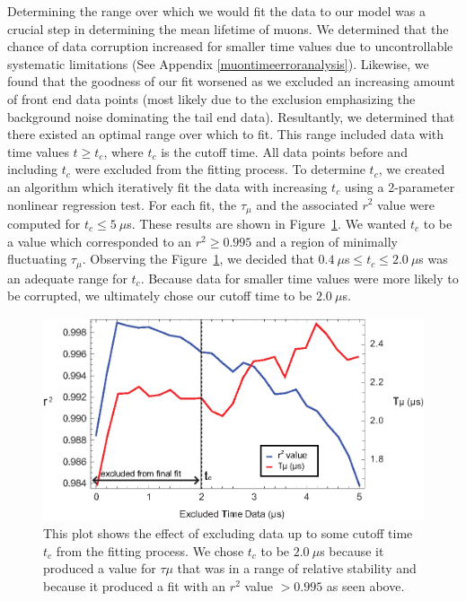 Determining the range over which we would fit the data to our model
was a crucial step in determining the mean lifetime of muons.  We
determined that the chance of data corruption increased for smaller
time values due to uncontrollable systematic
limitations (See Appendix \ref{muontimeerroranalysis}). Likewise, we found that the goodness of our fit worsened as
we excluded an increasing amount of front end data points (most likely
due to the exclusion emphasizing the background noise dominating the
tail end data).  Resultantly, we determined that there existed an
optimal range over which to fit.  This range included data with time
values $t \geq t_{c}$, where $t_{c}$ is the cutoff time.  All data
points before and including $t_{c}$ were excluded from the fitting
process.  To determine $t_{c}$, we created an algorithm which
iteratively fit the data with increasing $t_{c}$ using a 2-parameter
nonlinear regression test.  For each fit, the $\tau_{\mu}$ and the
associated $r^{2}$ value were computed for $t_{c}\leq 5~\mu$s.  These
results are shown in Figure~\ref{fig:rsq}.  We wanted $t_{c}$ to be a
value which corresponded to an $r^{2} \geq 0.995$ and a region of
minimally fluctuating $\tau_{\mu}$.  Observing the Figure~\ref{fig:rsq}, we decided
that $0.4~\mu$s$ \leq t_{c}\leq 2.0~\mu$s was an adequate range for $t_{c}$.
Because data for smaller time values were more likely to be corrupted,
we ultimately chose our cutoff time to be $2.0~\mu$s.


\begin{figure}[htbp]
\begin{center}
\includegraphics[height=60mm]{./figures/lifetime_fit_param.eps}
\caption{This plot shows the effect of excluding data up to some cutoff time $t_{c}$ from the fitting process.  We chose $t_{c}$ to be $2.0~\mu$s because it produced a value for $\tau{\mu}$ that was in a range of relative stability and because it produced a fit with an $r^{2}$ value $> 0.995$ as seen above.}
\label{fig:rsq}
\end{center}
\end{figure}

